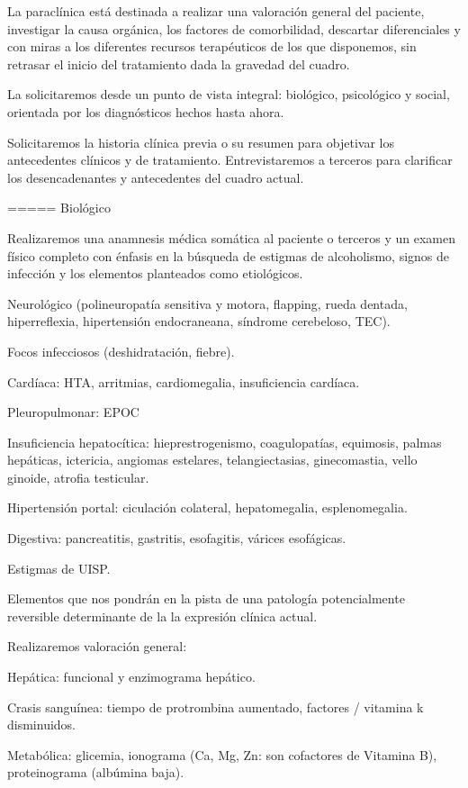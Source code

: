 \documentclass[encares.tex]{subfiles}
\begin{document}
La paraclínica está destinada a realizar una valoración general del paciente, investigar la causa orgánica, los factores de comorbilidad, descartar diferenciales y con miras a los diferentes recursos terapéuticos de los que disponemos, sin retrasar el inicio del tratamiento dada la gravedad del cuadro.

La solicitaremos desde un punto de vista integral: biológico, psicológico y social, orientada por los diagnósticos hechos hasta ahora.

Solicitaremos la historia clínica previa o su resumen para objetivar los antecedentes clínicos y de tratamiento. Entrevistaremos a terceros para clarificar los desencadenantes y antecedentes del cuadro actual.

===== Biológico

Realizaremos una anamnesis médica somática al paciente o terceros y un examen físico completo con énfasis en la búsqueda de estigmas de alcoholismo, signos de infección y los elementos planteados como etiológicos.

Neurológico (polineuropatía sensitiva y motora, flapping, rueda dentada, hiperreflexia, hipertensión endocraneana, síndrome cerebeloso, TEC).

Focos infecciosos (deshidratación, fiebre).

Cardíaca: HTA, arritmias, cardiomegalia, insuficiencia cardíaca.

Pleuropulmonar: EPOC

Insuficiencia hepatocítica: hieprestrogenismo, coagulopatías, equimosis, palmas hepáticas, ictericia, angiomas estelares, telangiectasias, ginecomastia, vello ginoide, atrofia testicular.

Hipertensión portal: ciculación colateral, hepatomegalia, esplenomegalia.

Digestiva: pancreatitis, gastritis, esofagitis, várices esofágicas.

Estigmas de UISP.

Elementos que nos pondrán en la pista de una patología potencialmente reversible determinante de la la expresión clínica actual.

Realizaremos valoración general:

Hepática: funcional y enzimograma hepático.

Crasis sanguínea: tiempo de protrombina aumentado, factores / vitamina k disminuidos.

Metabólica: glicemia, ionograma (Ca, Mg, Zn: son cofactores de Vitamina B), proteinograma (albúmina baja).
\end{document}
